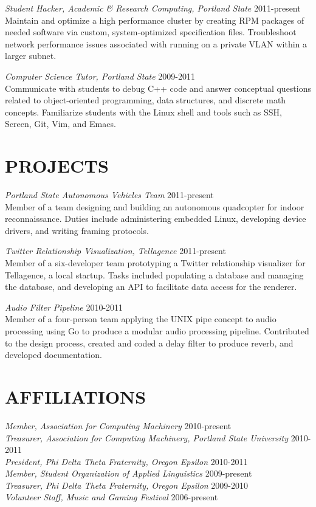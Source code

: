 \documentclass[overlapped]{res}
\begin{document}
\begin{resume}
{\sl Student Hacker, Academic \& Research Computing, Portland State} \hfill 2011-present\\
Maintain and optimize a high performance cluster by creating RPM packages of needed software via custom, system-optimized specification files. Troubleshoot network performance issues associated with running on a private VLAN within a larger subnet.

{\sl Computer Science Tutor, Portland State} \hfill 2009-2011\\
Communicate with students to debug C++ code and answer conceptual questions related to object-oriented programming, data structures, and discrete math concepts. Familiarize students with the Linux shell and tools such as SSH, Screen, Git, Vim, and Emacs.

\section{PROJECTS} 
\vspace{7pt} 

{\sl Portland State Autonomous Vehicles Team} \hfill 2011-present\\
Member of a team designing and building an autonomous quadcopter for indoor reconnaissance. Duties include administering embedded Linux, developing device drivers, and writing framing protocols.

{\sl Twitter Relationship Visualization, Tellagence} \hfill 2011-present\\
Member of a six-developer team prototyping a Twitter relationship visualizer for Tellagence, a local startup. Tasks included populating a database and managing the database, and developing an API to facilitate data access for the renderer.

{\sl Audio Filter Pipeline} \hfill 2010-2011\\
Member of a four-person team applying the UNIX pipe concept to audio processing using Go to produce a modular audio processing pipeline. Contributed to the design process, created and coded a delay filter to produce reverb, and developed documentation.

\section{AFFILIATIONS}
\vspace{7pt} 

{\sl Member, Association for Computing Machinery} \hfill 2010-present\\
{\sl Treasurer, Association for Computing Machinery, Portland State University} \hfill 2010-2011\\
{\sl President, Phi Delta Theta Fraternity, Oregon Epsilon} \hfill 2010-2011\\
{\sl Member, Student Organization of Applied Linguistics} \hfill 2009-present\\
{\sl Treasurer, Phi Delta Theta Fraternity, Oregon Epsilon} \hfill 2009-2010\\
{\sl Volunteer Staff, Music and Gaming Festival} \hfill 2006-present


\end{resume}
\end{document}
